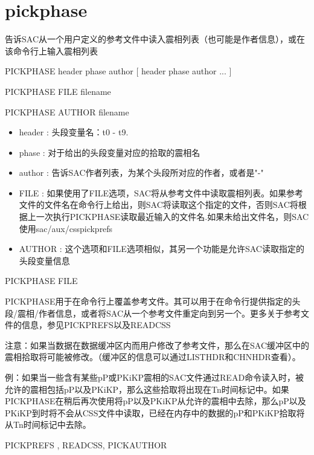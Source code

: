\section{pickphase}
\label{cmd:pickphase}

告诉SAC从一个用户定义的参考文件中读入震相列表（也可能是作者信息），或在该命令行上输入震相列表

PICKPHASE header phase author [ header phase author ... ]

PICKPHASE FILE {filename}

PICKPHASE AUTHOR {filename}

\begin{itemize}
\item header : 头段变量名：t0 - t9. 
\item phase : 对于给出的头段变量对应的拾取的震相名 
\item author : 告诉SAC作者列表，为某个头段所对应的作者，或者是"-" 
\item FILE : 如果使用了FILE选项，SAC将从参考文件中读取震相列表。如果参考文件的文件名在命令行上给出，则SAC将读取这个指定的文件，否则SAC将根据上一次执行PICKPHASE读取最近输入的文件名.如果未给出文件名，则SAC使用sac/aux/csspickprefs 
\item AUTHOR : 这个选项和FILE选项相似，其另一个功能是允许SAC读取指定的头段变量信息
\end{itemize}

PICKPHASE FILE

PICKPHASE用于在命令行上覆盖参考文件。其可以用于在命令行提供指定的头段/震相/作者信息，或者将SAC从一个参考文件重定向到另一个。更多关于参考文件的信息，参见PICKPREFS以及READCSS

注意：如果当数据在数据缓冲区内而用户修改了参考文件，那么在SAC缓冲区中的震相拾取将可能被修改。（缓冲区的信息可以通过LISTHDR和CHNHDR查看）。

例：如果当一些含有某些pP或PKiKP震相的SAC文件通过READ命令读入时，被允许的震相包括pP以及PKiKP，那么这些拾取将出现在Tn时间标记中。如果PICKPHASE在稍后再次使用将pP以及PKiKP从允许的震相中去除，那么pP以及PKiKP到时将不会从CSS文件中读取，已经在内存中的数据的pP和PKiKP拾取将从Tn时间标记中去除。

PICKPREFS , READCSS, PICKAUTHOR
